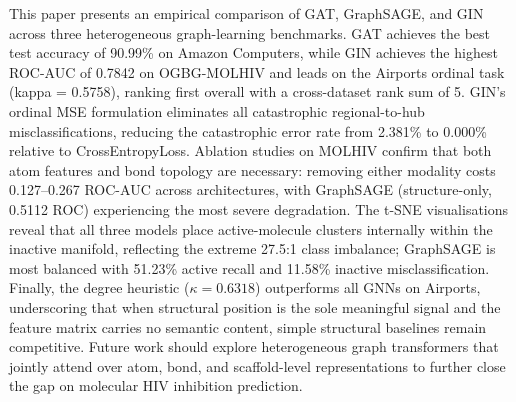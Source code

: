 \documentclass[conference]{IEEEtran}
\begin{document}
This paper presents an empirical comparison of GAT, GraphSAGE, and GIN across three heterogeneous graph-learning benchmarks. GAT achieves the best test accuracy of 90.99\% on Amazon Computers, while GIN achieves the highest ROC-AUC of 0.7842 on OGBG-MOLHIV and leads on the Airports ordinal task (kappa = 0.5758), ranking first overall with a cross-dataset rank sum of 5. GIN's ordinal MSE formulation eliminates all catastrophic regional-to-hub misclassifications, reducing the catastrophic error rate from 2.381\% to 0.000\% relative to CrossEntropyLoss. Ablation studies on MOLHIV confirm that both atom features and bond topology are necessary: removing either modality costs 0.127--0.267 ROC-AUC across architectures, with GraphSAGE (structure-only, 0.5112 ROC) experiencing the most severe degradation. The t-SNE visualisations reveal that all three models place active-molecule clusters internally within the inactive manifold, reflecting the extreme 27.5:1 class imbalance; GraphSAGE is most balanced with 51.23\% active recall and 11.58\% inactive misclassification. Finally, the degree heuristic ($\kappa = 0.6318$) outperforms all GNNs on Airports, underscoring that when structural position is the sole meaningful signal and the feature matrix carries no semantic content, simple structural baselines remain competitive. Future work should explore heterogeneous graph transformers that jointly attend over atom, bond, and scaffold-level representations to further close the gap on molecular HIV inhibition prediction.
\end{document}
